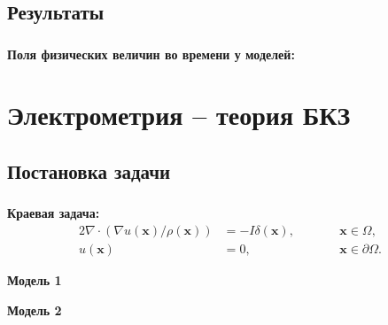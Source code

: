 
\subsection{Результаты}

\begin{frame}
\frametitle{\insertsection}
\framesubtitle{\insertsubsection}

\textbf{Поля физических величин во времени у моделей:}

\hspace{-0.9cm}
\begin{minipage}[t]{0.5\linewidth}
\end{minipage}
\hfill
\begin{minipage}[t]{0.5\linewidth}
\end{minipage}
\end{frame}


\section{Электрометрия -- теория БКЗ}


\subsection{Постановка задачи}

\begin{frame}
\frametitle{\insertsection}
\framesubtitle{\insertsubsection}

\textbf{Краевая задача:}
\begin{alignat*}{2}
\nabla \cdot (\nabla u(\bm x) / \rho(\bm x)) &= -I \delta(\bm x),\qquad && \bm x \in \varOmega, \\
u(\bm x) &= 0, && \bm x \in \partial \varOmega.
\end{alignat*}

\begin{minipage}[t]{0.47\linewidth}
    \textbf{Модель 1}
\end{minipage}
\hfill
\begin{minipage}[t]{0.47\linewidth}
    \textbf{Модель 2}
\end{minipage}
\end{frame}

